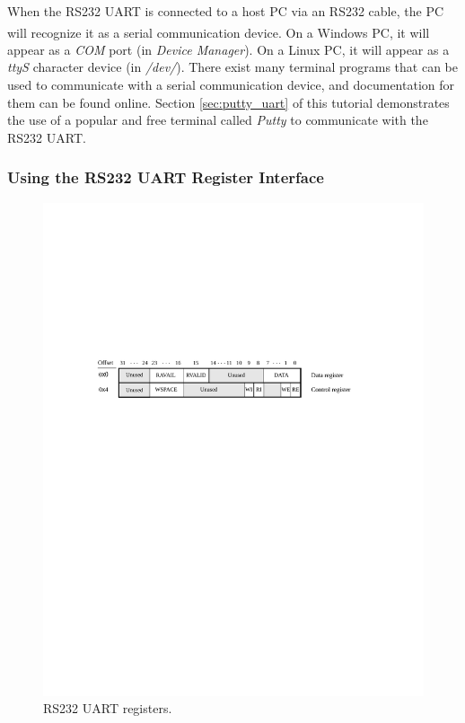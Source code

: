 \documentclass[11pt, twoside, pdftex]{article}
\begin{document}
When the RS232 UART is connected to a host PC via an RS232 cable, the PC will recognize it as a serial communication device. On a Windows\textsuperscript{\textregistered} PC, it will appear as a \textit{COM} port (in \textit{Device Manager}). On a Linux PC, it will appear as a \textit{ttyS} character device (in \textit{/dev/}). There exist many terminal programs that can be used to communicate with a serial communication device, and documentation for them can be found online. Section \ref{sec:putty_uart} of this tutorial demonstrates the use of a popular and free terminal called \textit{Putty} to communicate with the RS232 UART.

\subsubsection{Using the RS232 UART Register Interface}
\label{sec:rs232_reg}

\begin{figure}[h!]
   \begin{center}
       \includegraphics{figures/fig_rs232uart_regmap.pdf}
   \end{center}
   \caption{RS232 UART registers.}
	\label{fig:rs232_uart_regmap}
\end{figure}
\end{document}
